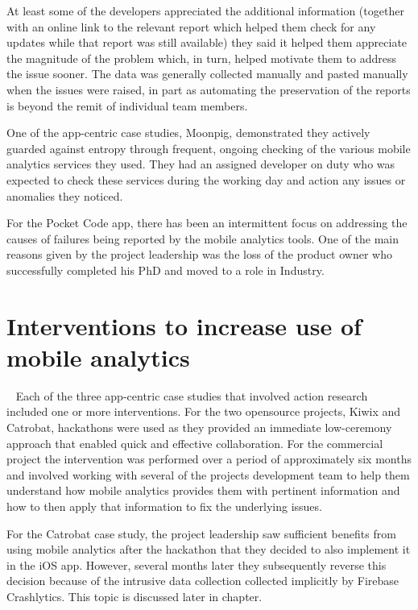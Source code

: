 At least some of the developers appreciated the additional information (together with an online link to the relevant report which helped them check for any updates while that report was still available) they said it helped them appreciate the magnitude of the problem which, in turn, helped motivate them to address the issue sooner. The data was generally collected manually and pasted manually when the issues were raised, in part as automating the preservation of the reports is beyond the remit of individual team members.

One of the app-centric case studies, Moonpig, demonstrated they actively guarded against entropy through frequent, ongoing checking of the various mobile analytics services they used. They had an assigned developer on duty who was expected to check these services during the working day and action any issues or anomalies they noticed.


For the Pocket Code app, there has been an intermittent focus on addressing the causes of failures being reported by the mobile analytics tools. One of the main reasons given by the project leadership was the loss of the product owner who successfully completed his PhD and moved to a role in Industry. 


\section{Interventions to increase use of mobile analytics}~\label{aiu-interventions-section}
Each of the three app-centric case studies that involved action research included one or more interventions. For the two opensource projects, Kiwix and Catrobat, hackathons were used as they provided an immediate low-ceremony approach that enabled quick and effective collaboration. For the commercial project the intervention was performed over a period of approximately six months and involved working with several of the projects development team to help them understand how mobile analytics provides them with pertinent information and how to then apply that information to fix the underlying issues. 

For the Catrobat case study, the project leadership saw sufficient benefits from using mobile analytics after the hackathon that they decided to also implement it in the iOS app. However, several months later they subsequently reverse this decision because of the intrusive data collection collected implicitly by Firebase Crashlytics. This topic is discussed later in chapter.


